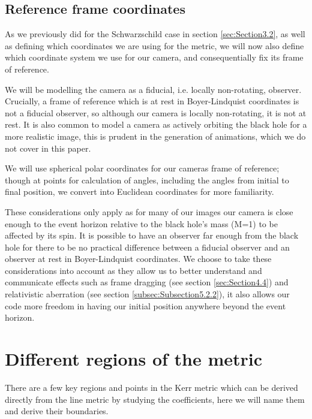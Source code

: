 \documentclass[oneside,openright,frontopenright, singlespacing]{dmathesis}
\begin{document}
\subsection{Reference frame coordinates}\label{subsec:Subsection4.2.1}

	As we previously did for the Schwarzschild case in section \ref{sec:Section3.2}, as well as defining which coordinates we are using for the metric, we will now also define which coordinate system we use for our camera, and consequentially fix its frame of reference. 

\vspace{1em}
	We will be modelling the camera as a fiducial, i.e. locally non-rotating, observer. Crucially, a frame of reference which is at rest in Boyer-Lindquist coordinates is not a fiducial observer, so although our camera is locally non-rotating, it is not at rest. It is also common to model a camera as actively orbiting the black hole for a more realistic image, this is prudent in the generation of animations, which we do not cover in this paper.

\vspace{1em}
	We will use spherical polar coordinates for our cameras frame of reference; though at points for calculation of angles, including the angles from initial to final position, we convert into Euclidean coordinates for more familiarity.

\vspace{1em}
	These considerations only apply as for many of our images our camera is close enough to the event horizon relative to the black hole's mass (M=1) to be affected by its spin. It is possible to have an observer far enough from the black hole for there to be no practical difference between a fiducial observer and an observer at rest in Boyer-Lindquist coordinates. We choose to take these considerations into account as they allow us to better understand and communicate effects such as frame dragging (see section \ref{sec:Section4.4}) and relativistic aberration (see section \ref{subsec:Subsection5.2.2}), it also allows our code more freedom in having our initial position anywhere beyond the event horizon.


\section{Different regions of the metric}\label{sec:Section4.3}

	There are a few key regions and points in the Kerr metric which can be derived directly from the line metric by studying the coefficients, here we will name them and derive their boundaries.
\end{document}
